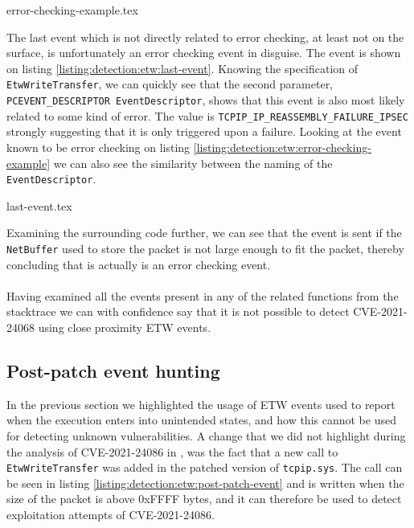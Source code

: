 \documentclass{report}
\begin{document}
{error-checking-example.tex}

The last event which is not directly related to error checking, at least not on the surface, is unfortunately an error checking event in disguise. The event is shown on listing \ref{listing:detection:etw:last-event}. Knowing the specification of \texttt{EtwWriteTransfer}\cite{url:etw:etwwritetransfer-api}, we can quickly see that the second parameter, \texttt{PCEVENT_DESCRIPTOR EventDescriptor}, shows that this event is also most likely related to some kind of error\cite{url:etw:etwwritetransfer-api}. The value is \texttt{TCPIP_IP_REASSEMBLY_FAILURE_IPSEC}\cite{url:etw:etw-event-descriptor} strongly suggesting that it is only triggered upon a failure. Looking at the event known to be error checking on listing \ref{listing:detection:etw:error-checking-example} we can also see the similarity between the naming of the \texttt{EventDescriptor}.

{last-event.tex}

Examining the surrounding code further, we can see that the event is sent if the \texttt{NetBuffer} used to store the packet is not large enough to fit the packet, thereby concluding that is actually is an error checking event.
\\
\\
Having examined all the events present in any of the related functions from the stacktrace we can with confidence say that it is not possible to detect CVE-2021-24068 using close proximity \gls{ETW} events.


\subsection{Post-patch  event hunting}
In the previous section we highlighted the usage of \gls{ETW} events used to report when the execution enters into unintended states, and how this cannot be used for detecting unknown vulnerabilities. A change that we did not highlight during the analysis of CVE-2021-24086 in , was the fact that a new call to \texttt{EtwWriteTransfer} was added in the patched version of \texttt{tcpip.sys}. The call can be seen in listing \ref{listing:detection:etw:post-patch-event} and is written when the size of the packet is above 0xFFFF bytes, and it can therefore be used to detect exploitation attempts of CVE-2021-24086.
\end{document}

